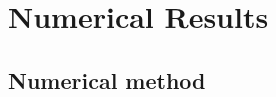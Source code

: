 \documentclass[11pt,leqno]{amsart}
\newtheorem{cor}[thm]{COROLLARY}
\theoremstyle{definition}
\newcommand{\be}{\begin{equation}}
\newcommand{\ee}{\end{equation}}
\newcommand{\bes}{\begin{equation*}}
\newcommand{\ees}{\end{equation*}}
\newcommand{\comment}[1]{{\color{red}#1}} %
\newcommand{\R}{{\mathord{\mathbb R}}}
\newcommand{\Rd}{{\mathord{\mathbb R}^d}}
\newcommand{\grad}{\nabla}
\def\P{{\mathcal P}}
\def\epsilon{\varepsilon}
\def\e{\varepsilon}
\begin{document}
%

\section{Numerical Results}
\subsection{Numerical method} \label{numericalmethod}


%
%
\end{document}
